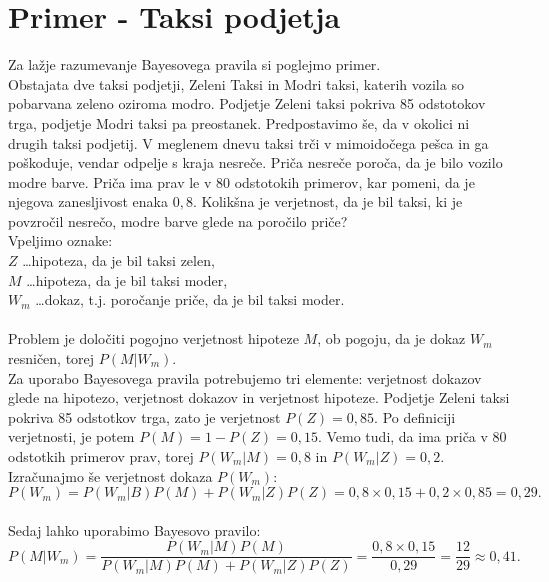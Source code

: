\documentclass[12pt,a4paper]{amsart}
\theoremstyle{definition} %
\theoremstyle{plain} %
\begin{document}
\section{Primer - Taksi podjetja}
Za lažje razumevanje Bayesovega pravila si poglejmo primer. \\

Obstajata dve taksi podjetji, Zeleni Taksi in Modri taksi, katerih vozila so pobarvana zeleno oziroma modro. Podjetje Zeleni taksi pokriva 
85 odstotokov trga, podjetje Modri taksi pa preostanek. Predpostavimo še, da v okolici ni drugih taksi podjetij. V meglenem dnevu taksi trči 
v mimoidočega pešca in ga poškoduje, vendar odpelje s kraja nesreče. Priča nesreče poroča, da je bilo vozilo modre barve. Priča ima prav le 
v 80 odstotokih primerov, kar pomeni, da je njegova zanesljivost enaka $0,8$. Kolikšna je verjetnost, da je bil taksi, ki je povzročil nesrečo, 
modre barve glede na poročilo priče? \\

Vpeljimo oznake:\\
$Z$ \dots hipoteza, da je bil taksi zelen, \\
$M$ \dots hipoteza, da je bil taksi moder, \\
$W_m$ \dots dokaz, t.j. poročanje priče, da je bil taksi moder. \\ \\
Problem je določiti pogojno verjetnost hipoteze $M$, ob pogoju, da je dokaz $W_m$ resničen, torej $P(M \lvert W_m)$. \\

Za uporabo Bayesovega pravila potrebujemo tri elemente: verjetnost dokazov glede na hipotezo, verjetnost dokazov in verjetnost hipoteze. Podjetje 
Zeleni taksi pokriva 85 odstotkov trga, zato je verjetnost $P(Z)=0,85$. Po definiciji verjetnosti, je potem $P(M)=1-P(Z)=0,15$. Vemo tudi, da ima 
priča v 80 odstotkih primerov prav, torej $P(W_m \lvert M) = 0,8$ in $P(W_m \lvert Z) = 0,2$. Izračunajmo še verjetnost dokaza $P(W_m)$:\\
\[P(W_m) = P(W_m \lvert B)P(M) + P(W_m \lvert Z)P(Z)= 0,8 \times 0,15 + 0,2 \times 0,85 = 0,29.\]\\

Sedaj lahko uporabimo Bayesovo pravilo:
\[P(M \lvert W_m)= \frac{P(W_m \lvert M)P(M)}{P(W_m \lvert M)P(M) + P(W_m \lvert Z)P(Z)} = \frac{0,8 \times 0,15}{0,29} = \frac{12}{29} \approx 0,41.\] \\
\end{document}
